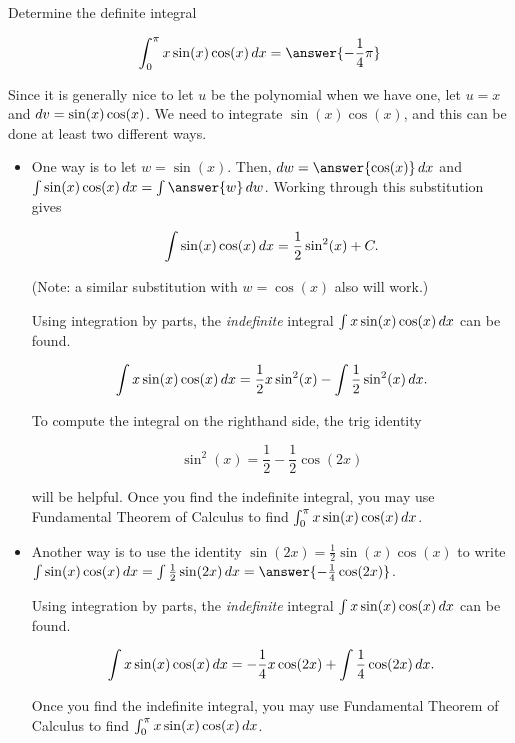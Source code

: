 \documentclass{ximera}
\author{Jason Miller and Jim Talamo}
\begin{document}
\begin{exercise}
Determine the definite integral 

\[
\int_0^{\pi} x\sin(x) \cos(x) \d x = \answer{-\frac{1}{4} \pi}
\]

\begin{hint}
Since it is generally nice to let $u$ be the polynomial when we have one, let $u = x$ and $\mathop{}\!d v = \sin(x) \cos(x)$.  We need to integrate $\sin(x) \cos(x)$, and this can be done at least two different ways.

\begin{itemize}
\item One way is to let $w=\sin(x)$.  Then, $\d w = \answer{\cos(x)} \d x$ and $\int \sin(x) \cos(x) \d x = \int \answer{w} \d w$.  Working through this substitution gives

\[
\int \sin(x) \cos(x) \mathop{}\!d x = \frac{1}{2}\sin^2(x)+C.
\]
 
(Note: a similar substitution with $w=\cos(x)$ also will work.)

Using integration by parts, the \emph{indefinite} integral $\int x\sin(x) \cos(x) \mathop{}\!d x$ can be found.

\[
\int x\sin(x) \cos(x) \mathop{}\!d x =\frac{1}{2}x\sin^2(x) - \int \frac{1}{2} \sin^2(x) \mathop{}\!d x. 
\]

To compute the integral on the righthand side, the trig identity

\[
\sin^2(x) = \frac{1}{2} - \frac{1}{2} \cos(2x)
\] 

will be helpful.  Once you find the indefinite integral, you may use Fundamental Theorem of Calculus to find $\int_0^{\pi} x\sin(x) \cos(x) \mathop{}\!d x $.

 \item Another way is to use the identity $\sin(2x) = \frac{1}{2} \sin(x)\cos(x)$ to write $\int  \sin(x)\cos(x) \d x = \int \frac{1}{2} \sin(2x) \d x = \answer{-\frac{1}{4}\cos(2x)}$.

Using integration by parts, the \emph{indefinite} integral $\int x\sin(x) \cos(x) \mathop{}\!d x$ can be found.

\[
\int x\sin(x) \cos(x) \mathop{}\!d x =-\frac{1}{4}x\cos(2x) + \int \frac{1}{4} \cos(2x) \mathop{}\!d x. 
\]

Once you find the indefinite integral, you may use Fundamental Theorem of Calculus to find $\int_0^{\pi} x\sin(x) \cos(x) \mathop{}\!d x $.

\end{itemize}
 
\end{hint}


\end{exercise}
\end{document}
